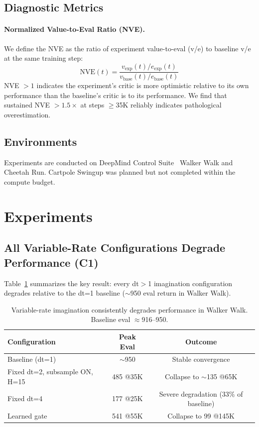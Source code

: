 \documentclass[10pt,letterpaper]{article}
\begin{document}
\subsection{Diagnostic Metrics}

\paragraph{Normalized Value-to-Eval Ratio (NVE).}
We define the NVE as the ratio of experiment value-to-eval (v/e) to baseline v/e at the same training step:
\begin{equation}
    \text{NVE}(t) = \frac{v_{\text{exp}}(t) / e_{\text{exp}}(t)}{v_{\text{base}}(t) / e_{\text{base}}(t)}
    \label{eq:nve}
\end{equation}
NVE $>1$ indicates the experiment's critic is more optimistic relative to its own performance than the baseline's critic is to its performance.
We find that sustained NVE $>1.5\times$ at steps $\geq$35K reliably indicates pathological overestimation.

\subsection{Environments}
Experiments are conducted on DeepMind Control Suite~\citep{tassa2018dmcontrol} Walker Walk and Cheetah Run.
Cartpole Swingup was planned but not completed within the compute budget.

\section{Experiments}
\label{sec:experiments}

\subsection{All Variable-Rate Configurations Degrade Performance (C1)}

Table~\ref{tab:c1_degradation} summarizes the key result: every dt$>$1 imagination configuration degrades relative to the dt=1 baseline ($\sim$950 eval return in Walker Walk).

\begin{table}[h]
\centering
\caption{Variable-rate imagination consistently degrades performance in Walker Walk. Baseline eval $\approx$916--950.}
\label{tab:c1_degradation}
\begin{tabular}{lcc}
\toprule
Configuration & Peak Eval & Outcome \\
\midrule
Baseline (dt=1) & $\sim$950 & Stable convergence \\
Fixed dt=2, subsample ON, H=15 & 485 @35K & Collapse to $\sim$135 @65K \\
Fixed dt=4 & 177 @25K & Severe degradation (33\% of baseline) \\
Learned gate & 541 @55K & Collapse to 99 @145K \\
\bottomrule
\end{tabular}
\end{table}
\end{document}
